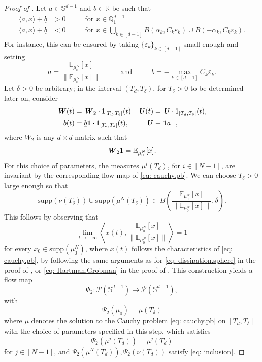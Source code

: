 \documentclass[a4paper,11pt]{article}
\theoremstyle{plain}
\newcommand{\supp}{\mathrm{supp}}
\newcommand{\R}{\mathbb{R}}
\renewcommand{\S}{\mathbb{S}^{d-1}}
\newcommand{\bW}{\bm{\mathit{W}}}
\newcommand{\bU}{\bm{\mathit{U}}}
\newcommand{\Q}{\mathbb{Q}}
\numberwithin{equation}{section}
\begin{document}
\begin{proof}[Proof of ]
Let $a\in\S$ and $\underline{b}\in\R$ be such that 
    \begin{align*}
    \langle a,x\rangle +\underline{b}&>0\hspace{1cm}\text{ for }x\in \Q_1^{d-1}\\
\langle a,x\rangle +\underline{b}&<0\hspace{1cm}\text{ for }x\in \bigcup_{k\in[d-1]} B(\alpha_k,C_k\varepsilon_k)\cup B(-\alpha_k, C_k\varepsilon_k).
\end{align*}
For instance, this can be ensured by taking $\{\varepsilon_k\}_{k\in[d-1]}$ small enough and setting 
\begin{equation*}
    a=\frac{\mathbb{E}_{\mu_0^N}[x]}{\|\mathbb{E}_{\mu_0^N}[x]\|} \hspace{1cm}\text{ and } \hspace{1cm} b=- \max_{k\in[d-1]} C_k\varepsilon_k.
\end{equation*} 
Let $\delta>0$ be arbitrary; in the interval $(T_{d},T_\delta)$, for $T_\delta>0$ to be determined later on, consider 
\begin{align*}
\bW(t)&=\bW_2\cdot 1_{[T_d,T_\delta]}(t) &
\bU(t)&=\bU\cdot 1_{[T_d,T_\delta]}(t),\\
b(t)&=\underline{b}{\bf1}\cdot 1_{[T_d,T_\delta]}(t), &
\bU&\equiv{\bf1}a^\top,
\end{align*}
where $\bW_2$ is any $d\times d$ matrix such that
\begin{equation*}
    \bW_2 {\bf1}= \mathbb{E}_{\mu_0^N}[x].
\end{equation*}
For this choice of parameters, the measures $\mu^i(T_d)$, for $i\in[N-1]$, are invariant by the corresponding flow map of \eqref{eq: cauchy.pb}. We can choose $T_\delta>0$ large enough so that
\begin{equation} \label{eq: inclusion}
\supp\left(\nu(T_\delta)\right)\cup\supp\left(\mu^N(T_\delta)\right)\subset B\left(  \frac{\mathbb{E}_{\mu_0^N}[x]}{\|\mathbb{E}_{\mu_0^N}[x]\|},\delta\right).
\end{equation}
This follows by observing that 
\begin{equation*}
\lim_{t\to+\infty}\left\langle x(t),\frac{\mathbb{E}_{\mu_0^N}[x]}{\|\mathbb{E}_{\mu_0^N}[x]\|}\right\rangle =1    
\end{equation*}
for every $x_0\in\supp(\mu_0^N)$, where $x(t)$ follows the characteristics of \eqref{eq: cauchy.pb}, by following the same arguments as for \eqref{eq: dissipation.sphere} in the proof of , or \eqref{eq: Hartman.Grobman} in the proof of .
This construction yields a flow map 
$$\Psi_2:\mathscr{P}(\S)\to\mathscr{P}(\S),$$ 
with 
$$\Psi_2(\mu_0)=\mu(T_\delta)$$
where $\mu$ denotes the solution to the Cauchy problem \eqref{eq: cauchy.pb} on $[T_d, T_\delta]$ with the choice of parameters specified in this step, which satisfies 
$$\Psi_2(\mu^j(T_d))=\mu^j(T_d)$$ for $j\in[N-1]$,
and $\Psi_2(\mu^N(T_d)),\Psi_2(\nu(T_d))$
satisfy \eqref{eq: inclusion}.



\end{proof}
\end{document}
